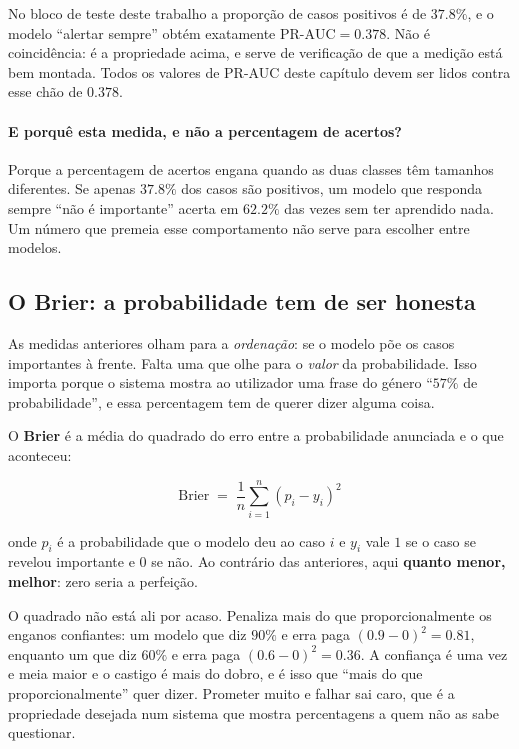 No bloco de teste deste trabalho a proporção de casos positivos é de $37.8\%$, e o modelo
``alertar sempre'' obtém exatamente $\text{PR-AUC} = 0.378$. Não é coincidência: é a propriedade
acima, e serve de verificação de que a medição está bem montada. Todos os valores de PR-AUC deste
capítulo devem ser lidos contra esse chão de $0.378$.

\paragraph{E porquê esta medida, e não a percentagem de acertos?}
Porque a percentagem de acertos engana quando as duas classes têm tamanhos diferentes. Se apenas
$37.8\%$ dos casos são positivos, um modelo que responda sempre ``não é importante'' acerta em
$62.2\%$ das vezes sem ter aprendido nada. Um número que premeia esse comportamento não serve para
escolher entre modelos.

\subsection{O Brier: a probabilidade tem de ser honesta}
\label{sec:av_brier}

As medidas anteriores olham para a \emph{ordenação}: se o modelo põe os casos importantes à frente.
Falta uma que olhe para o \emph{valor} da probabilidade. Isso importa porque o sistema mostra ao
utilizador uma frase do género ``$57\%$ de probabilidade'', e essa percentagem tem de querer dizer
alguma coisa.

O \textbf{Brier} é a média do quadrado do erro entre a probabilidade anunciada e o que aconteceu:

\begin{equation}
  \text{Brier} \;=\; \frac{1}{n}\sum_{i=1}^{n}\left(p_i - y_i\right)^2
  \label{eq:brier}
\end{equation}

onde $p_i$ é a probabilidade que o modelo deu ao caso $i$ e $y_i$ vale $1$ se o caso se revelou
importante e $0$ se não. Ao contrário das anteriores, aqui \textbf{quanto menor, melhor}: zero seria
a perfeição.

O quadrado não está ali por acaso. Penaliza mais do que proporcionalmente os enganos confiantes: um
modelo que diz $90\%$ e erra paga $(0.9-0)^2 = 0.81$, enquanto um que diz $60\%$ e erra paga
$(0.6-0)^2 = 0.36$. A confiança é uma vez e meia maior e o castigo é mais do dobro, e é isso que
``mais do que proporcionalmente'' quer dizer. Prometer muito e falhar sai caro, que é a propriedade
desejada num sistema que mostra percentagens a quem não as sabe questionar.


